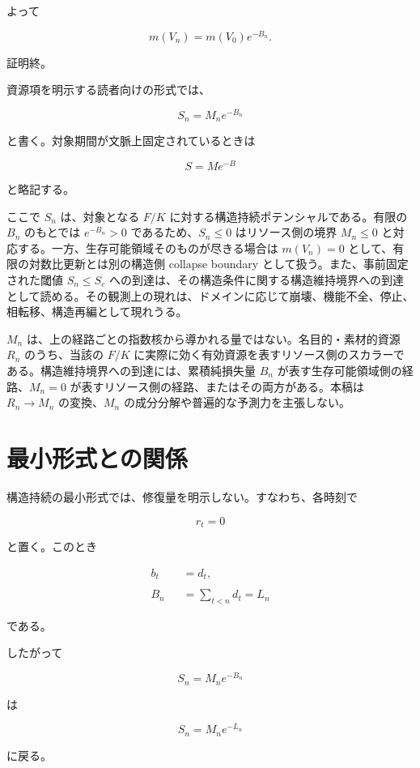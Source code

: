 \documentclass[12pt,a4paper]{article}
\begin{document}
よって

\[
m(V_{n}) = m(V_0)e^{-B_{n}}.
\]

証明終。

資源項を明示する読者向けの形式では、

\[
S_{n} = M_{n} e^{-B_{n}}
\]

と書く。対象期間が文脈上固定されているときは

\[
S = M e^{-B}
\]

と略記する。

ここで \(S_{n}\) は、対象となる \(F/K\) に対する構造持続ポテンシャルである。有限の \(B_n\) のもとでは \(e^{-B_n}>0\) であるため、\(S_n\le0\) はリソース側の境界 \(M_n\le0\) と対応する。一方、生存可能領域そのものが尽きる場合は \(m(V_n)=0\) として、有限の対数比更新とは別の構造側 collapse boundary として扱う。また、事前固定された閾値 \(S_{n}\le S_{c}\) への到達は、その構造条件に関する構造維持境界への到達として読める。その観測上の現れは、ドメインに応じて崩壊、機能不全、停止、相転移、構造再編として現れうる。

\(M_{n}\) は、上の経路ごとの指数核から導かれる量ではない。名目的・素材的資源 \(R_n\) のうち、当該の \(F/K\) に実際に効く有効資源を表すリソース側のスカラーである。構造維持境界への到達には、累積純損失量 \(B_{n}\) が表す生存可能領域側の経路、\(M_{n}=0\) が表すリソース側の経路、またはその両方がある。本稿は \(R_n\to M_n\) の変換、\(M_{n}\) の成分分解や普遍的な予測力を主張しない。

\section{最小形式との関係}\label{ux6700ux5c0fux5f62ux5f0fux3068ux306eux95a2ux4fc2}

構造持続の最小形式では、修復量を明示しない。すなわち、各時刻で

\[
r_{t}=0
\]

と置く。このとき

\[
\begin{aligned}
b_{t}&=d_{t}, \\
\qquad \\
B_{n}&=\sum_{t<n}d_{t}=L_{n}
\end{aligned}
\]

である。

したがって

\[
S_{n}=M_{n}e^{-B_{n}}
\]

は

\[
S_{n}=M_{n}e^{-L_{n}}
\]

に戻る。
\end{document}
